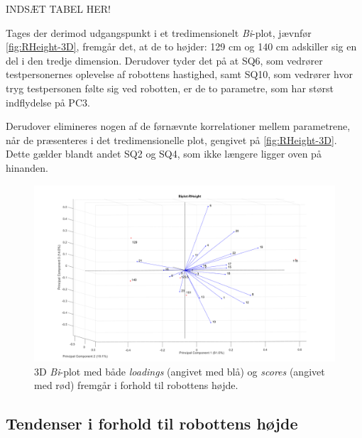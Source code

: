 INDSÆT TABEL HER!\blankline


Tages der derimod udgangspunkt i et tredimensionelt \textit{Bi}-plot, jævnfør \autoref{fig:RHeight-3D}, fremgår det, at de to højder: 129 cm og 140 cm adskiller sig en del i den tredje dimension. Derudover tyder det på at SQ6, som vedrører testpersonernes oplevelse af robottens hastighed, samt SQ10, som vedrører hvor tryg testpersonen følte sig ved robotten, er de to parametre, som har størst indflydelse på PC3. 

Derudover elimineres nogen af de førnævnte korrelationer mellem parametrene, når de præsenteres i det tredimensionelle plot, gengivet på \autoref{fig:RHeight-3D}. Dette gælder blandt andet SQ2 og SQ4, som ikke længere ligger oven på hinanden.   
%
\begin{figure}[H]
\centering
\includegraphics[width=\textwidth]{Figure/DatabehandlingSkalaer/PCAfigures/RHeight-3D.png}
\caption{3D \textit{Bi}-plot med både \textit{loadings} (angivet med blå) og \textit{scores} (angivet med rød) fremgår i forhold til robottens højde.}
\label{fig:RHeight-3D}
\end{figure}
%

\subsection{Tendenser i forhold til robottens højde}
\label{DatabehandlingRHeightTendenser}
%







